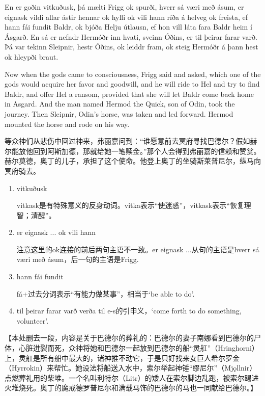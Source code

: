 \begin{paracol}{2}
  En er goðin vitkuðusk, þá mælti Frigg ok spurði, hverr sá væri með ásum, er eignask vildi allar ástir hennar ok hylli ok vili hann ríða á helveg ok freista, ef hann fái fundit Baldr, ok bjóða Helju útlausn, ef hon vill láta fara Baldr heim í Ásgarð. En sá er nefndr Hermóðr inn hvati, sveinn Óðins, er til þeirar farar varð. Þá var tekinn Sleipnir, hestr Óðins, ok leiddr fram, ok steig Hermóðr á þann hest ok hleypði braut.
  \switchcolumn

  Now when the gods came to consciousness, Frigg said and asked, which one of the gods would acquire her favor and goodwill, and he will ride to Hel and try to find Baldr, and offer Hel a ransom, provided that she will let Baldr come back home in Asgard. And the man named Hermod the Quick, son of Odin, took the journey. Then Sleipnir, Odin's horse, was taken and led forward. Hermod mounted the horse and rode on his way.
\end{paracol}
\begin{translation*}{}
  等众神们从悲伤中回过神来，弗丽嘉问到：“谁愿意前去冥府寻找巴德尔？假如赫尔能放他回到阿斯加德，那就给她一笔赎金。”那个人会得到弗丽嘉的信赖和赞赏。赫尔莫德，奥丁的儿子，承担了这个使命。他登上奥丁的坐骑斯莱普尼尔，纵马向冥府骑去。
\end{translation*}
\begin{grammar*}{}
  \begin{enumerate}[leftmargin=*]
    \item vitkuðusk

          vitkask是有特殊意义的反身动词。vitka表示“使迷惑”，vitkask表示“恢复理智；清醒”。

    \item er eignask ... ok vili hann

          注意这里的ok连接的前后两句主语不一致。er eignask ...从句的主语是hverr sá væri með ásum，后一句的主语是Frigg.

    \item hann fái fundit

          fá+过去分词表示“有能力做某事”，相当于`be able to do'.

    \item til þeirar farar varð
          verða til e-s的引申义，`come forth to do something, volunteer'.
  \end{enumerate}
\end{grammar*}
\medskip
【本处删去一段，内容是关于巴德尔的葬礼的：巴德尔的妻子南娜看到巴德尔的尸体，心脏迸裂而死，众神将她和巴德尔一起放到巴德尔的船“灵舡”（Hringhorni）上，灵舡是所有船中最大的，诸神推不动它，于是只好找来女巨人希尔罗金（Hyrrokin）来帮忙。她设法将船送入水中，索尔举起神锤“缪尼尔”（Mjǫllnir）点燃葬礼用的柴堆。一个名叫利特尔（Litr）的矮人在索尔脚边乱跑，被索尔踢进火堆烧死。奥丁的魔戒德罗普尼尔和满载马饰的巴德尔的马也一同献给巴德尔。】
